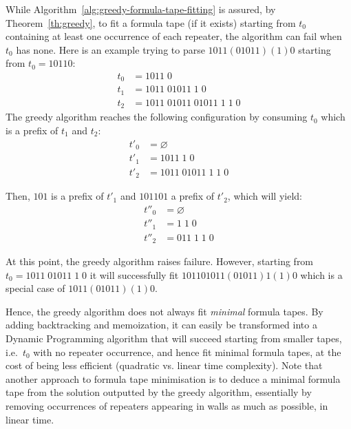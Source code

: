 \begin{remark}
    While Algorithm~\ref{alg:greedy-formula-tape-fitting} is assured, by Theorem~\ref{th:greedy},  to fit a formula tape (if it exists) starting from $t_0$ containing at least one occurrence of each repeater, the algorithm can fail when $t_0$ has none. Here is an example trying to parse $1011(01011)(1)0$ starting from $t_0 = 10110$:
    \begin{align*}
        t_0 & = 1011\; 0                         \\
        t_1 & = 1011\; 01011\; 1\; 0             \\
        t_2 & = 1011\; 01011\; 01011\; 1\; 1\; 0
    \end{align*}
    The greedy algorithm reaches the following configuration by consuming $t_0$ which is a prefix of $t_1$ and $t_2$:
    \begin{align*}
        t'_0 & = \varnothing              \\
        t'_1 & = 1011\; 1\; 0             \\
        t'_2 & = 1011\; 01011\; 1\; 1\; 0
    \end{align*}

    Then, $101$ is a prefix of $t'_1$ and $101 101$ a prefix of $t'_2$, which will yield:
    \begin{align*}
        t''_0 & = \varnothing     \\
        t''_1 & = 1\; 1\; 0       \\
        t''_2 & = 011\; 1\; 1\; 0
    \end{align*}

    At this point, the greedy algorithm raises failure. However, starting from $t_0 = 1011\; 01011\; 1\; 0$ it will successfully fit $101101011(01011)1(1)0$ which is a special case of $1011(01011)(1)0$.

    Hence, the greedy algorithm does not always fit \textit{minimal} formula tapes. By adding backtracking and memoization, it can easily be transformed into a Dynamic Programming algorithm that will succeed starting from smaller tapes, i.e.\ $t_0$ with no repeater occurrence, and hence fit minimal formula tapes, at the cost of being less efficient (quadratic vs. linear time complexity).
    Note that another approach to formula tape minimisation is to deduce a minimal formula tape from the solution outputted by the greedy algorithm, essentially by removing occurrences of repeaters appearing in walls as much as possible, in linear time.

\end{remark}

